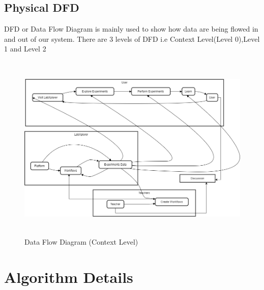 \subsection{Physical DFD}
DFD or Data Flow Diagram is mainly used to show how data are being flowed in and out of our system. There are 3 levels of DFD i.e Context Level(Level 0),Level 1 and Level 2
\begin{figure}[H]
    \centering
    \includegraphics[height = 9cm]{Diagrams/DFD.drawio.png}
    \caption{Data Flow Diagram (Context Level)}
\end{figure}
\newpage
\section{Algorithm Details}